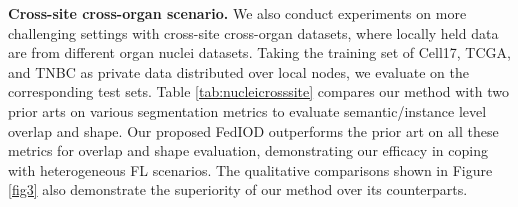 \documentclass[letterpaper]{article} %
\begin{document}
\textbf{Cross-site cross-organ scenario.}
We also conduct experiments on more challenging settings with cross-site cross-organ datasets, where locally held data are from different organ nuclei datasets.
Taking the training set of Cell17, TCGA, and TNBC as private data distributed over local nodes, we evaluate on the corresponding test sets. %
Table \ref{tab:nucleicrosssite} compares our method with two prior arts \cite{chang2020synthetic, mcmahan2017communication} on various segmentation metrics to evaluate semantic/instance level overlap and shape.
Our proposed FedIOD outperforms the prior art on all these metrics for overlap and shape evaluation,
demonstrating our efficacy in coping with heterogeneous FL scenarios. The qualitative comparisons shown in Figure \ref{fig3} also demonstrate the superiority of our method over its counterparts.

\begin{table}[h]
    \centering
\noindent\caption{Compare FedIOD and FedKD in terms of accuracy (\%) on CIFAR10 ($K$=20, $\alpha$=1) under same privacy cost. %
}
\label{tab:privacy-utility}
\end{table}
\end{document}
